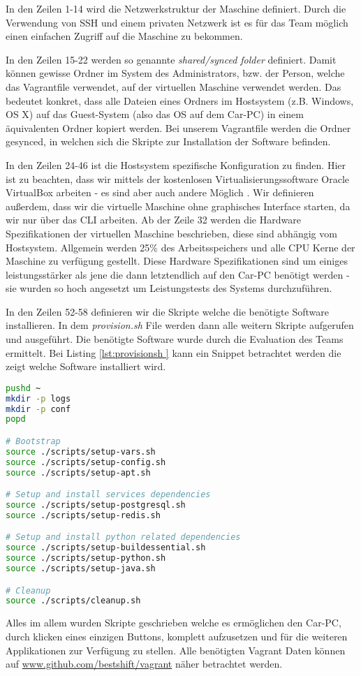 In den Zeilen 1-14 wird die Netzwerkstruktur der Maschine definiert. Durch die Verwendung von SSH \cite{MELD.CH3-ssh.website} und einem privaten Netzwerk ist es für das Team möglich einen einfachen Zugriff auf die Maschine zu bekommen.

In den Zeilen 15-22 werden so genannte \textit{shared/synced folder} \cite{MELD.CH3-vagrant.syncedFolders} definiert. Damit können gewisse Ordner im System des Administrators, bzw. der Person, welche das Vagrantfile verwendet, auf der virtuellen Maschine verwendet werden. Das bedeutet konkret, dass alle Dateien eines Ordners im Hostsystem (z.B. Windows, OS X) auf das Guest-System (also das OS auf dem Car-PC) in einem äquivalenten Ordner kopiert werden. Bei unserem Vagrantfile werden die Ordner gesynced, in welchen sich die Skripte zur Installation der Software befinden.

In den Zeilen 24-46 ist die Hostsystem spezifische Konfiguration zu finden. Hier ist zu beachten, dass wir mittels der kostenlosen Virtualisierungssoftware Oracle VirtualBox \cite{MELD.CH3-virtualbox.website} arbeiten - es sind aber auch andere Möglich \cite{MELD.CH3-vagrant.providers}. Wir definieren außerdem, dass wir die virtuelle Maschine ohne graphisches Interface starten, da wir nur über das CLI arbeiten. Ab der Zeile 32 werden die Hardware Spezifikationen der virtuellen Maschine beschrieben, diese sind abhängig vom Hostsystem. Allgemein werden 25\% des Arbeitsspeichers und alle CPU Kerne der Maschine zu verfügung gestellt. Diese Hardware Spezifikationen sind um einiges leistungsstärker als jene die dann letztendlich auf den Car-PC benötigt werden - sie wurden so hoch angesetzt um Leistungstests des Systems durchzuführen.

In den Zeilen 52-58 definieren wir die Skripte welche die benötigte Software installieren. In dem \textit{provision.sh} File werden dann alle weitern Skripte aufgerufen und ausgeführt. Die benötigte Software wurde durch die Evaluation des Teams ermittelt. Bei Listing \ref{lst:provisionsh } kann ein Snippet betrachtet werden die zeigt welche Software installiert wird.

\begin{lstlisting}[language=bash, caption=provision.sh,label={lst:provisionsh}]
pushd ~
mkdir -p logs
mkdir -p conf
popd

# Bootstrap
source ./scripts/setup-vars.sh
source ./scripts/setup-config.sh
source ./scripts/setup-apt.sh

# Setup and install services dependencies
source ./scripts/setup-postgresql.sh
source ./scripts/setup-redis.sh

# Setup and install python related dependencies
source ./scripts/setup-buildessential.sh
source ./scripts/setup-python.sh
source ./scripts/setup-java.sh

# Cleanup
source ./scripts/cleanup.sh
\end{lstlisting}

Alles im allem wurden Skripte geschrieben welche es ermöglichen den Car-PC, durch klicken eines einzigen Buttons, komplett aufzusetzen und für die weiteren Applikationen zur Verfügung zu stellen. Alle benötigten Vagrant Daten können auf \url{www.github.com/bestshift/vagrant} näher betrachtet werden.